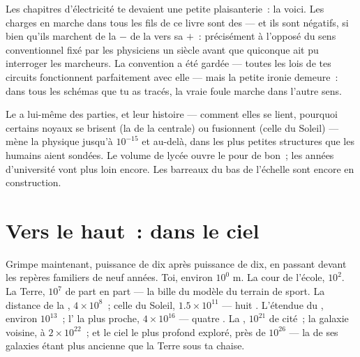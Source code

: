 \begin{example}\label{ex:g9:atoms-to-galaxies:electron}
Les chapitres d'électricité te devaient une petite plaisanterie~: la
voici. Les charges en marche dans tous les fils de ce livre sont des
\emph{} --- et ils sont négatifs, si bien qu'ils marchent de
la  $-$ de la  vers sa  $+$~: précisément à l'opposé du
sens conventionnel fixé par les physiciens un siècle avant que
quiconque ait pu interroger les marcheurs. La convention a été
gardée --- toutes les lois de tes circuits fonctionnent parfaitement
avec elle --- mais la petite ironie demeure~: dans tous les schémas
que tu as tracés, la vraie foule marche dans l'autre sens.
\end{example}

\begin{example}\label{ex:g9:atoms-to-galaxies:deeper}
Le  a lui-même des parties, et leur histoire --- comment elles se
lient, pourquoi certains noyaux se brisent (la  de la centrale)
ou fusionnent (celle du Soleil) --- mène la physique jusqu'à
$10^{-15}$  et au-delà, dans les plus petites structures que les
humains aient sondées. Le volume de lycée ouvre le  pour de bon~;
les années d'université vont plus loin encore. Les barreaux du bas de
l'échelle sont encore en construction.
\end{example}

\section{Vers le haut~: dans le ciel}

\begin{example}[L'ascension]\label{ex:g9:atoms-to-galaxies:ascent}
Grimpe maintenant, puissance de dix après puissance de dix, en passant
devant les repères familiers de neuf années. Toi, environ $10^{0}$
\unit{m}. La cour de l'école, $10^{2}$. La Terre, $10^{7}$ de part en
part --- la bille du modèle du terrain de sport. La distance de la
, $4 \times 10^{8}$~; celle du Soleil, $1.5 \times 10^{11}$ ---
huit . L'étendue du , environ
$10^{13}$~; l' la plus proche, $4 \times 10^{16}$ --- quatre
. La , $10^{21}$  de cité~; la galaxie
voisine, à $2 \times 10^{22}$~; et le ciel le plus profond exploré,
près de $10^{26}$  --- la  de ses galaxies étant plus
ancienne que la Terre sous ta chaise.
\end{example}

